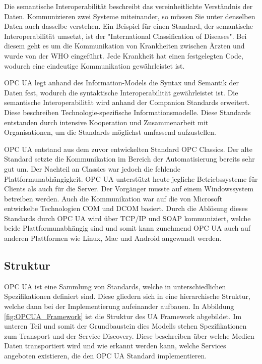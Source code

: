 \documentclass[a4paper, 12pt, oneside]{scrbook}
\begin{document}
	 Die semantische Interoperabilität beschreibt das vereinheitlichte Verständnis der Daten. Kommunizieren zwei Systeme miteinander, so müssen Sie unter denselben Daten auch dasselbe verstehen. Ein Beispiel für einen Standard, der semantische Interoperabilität umsetzt, ist der "International Classification of Diseases". Bei diesem geht es um die Kommunikation von Krankheiten zwischen Ärzten und wurde von der WHO eingeführt. Jede Krankheit hat einen festgelegten Code, wodurch eine eindeutige Kommunikation gewährleistet ist. \cite{mielebacher_verteilte_2021-1}
	 
	 OPC UA legt anhand des Information-Models die Syntax und Semantik der Daten fest, wodurch die syntaktische Interoperabilität gewährleistet ist. Die semantische Interoperabilität wird anhand der Companion Standards erweitert. Diese beschreiben Technologie-spezifische Informationsmodelle. Diese Standards entstanden durch intensive Kooperation und Zusammenarbeit mit Organisationen, um die Standards möglichst umfassend aufzustellen. \cite{mielebacher_verteilte_2021-1}
	 
	 OPC UA entstand aus dem zuvor entwickelten Standard OPC Classics. Der alte Standard setzte die Kommunikation im Bereich der Automatisierung bereits sehr gut um. Der Nachteil an Classics war jedoch die fehlende Plattformunabhängigkeit. OPC UA unterstützt heute jegliche Betriebssysteme für Clients als auch für die Server. Der Vorgänger musste auf einem Windowssystem betreiben werden. Auch die Kommunikation war auf die von Microsoft entwickelte Technologien \ac{COM} und \ac{DCOM} basiert. Durch die Ablösung dieses Standards durch OPC UA wird über TCP/IP und SOAP kommuniziert, welche beide Plattformunabhängig sind und somit kann zunehmend OPC UA auch auf anderen Plattformen wie Linux, Mac und Android angewandt werden. \cite{mielebacher_verteilte_2021-1}
	
		\subsection{Struktur}
		
		OPC UA ist eine Sammlung von Standards, welche in unterschiedlichen Spezifikationen definiert sind. Diese gliedern sich in eine hierarchische Struktur, welche dann bei der Implementierung aufeinander aufbauen. In Abbildung \ref{fig:OPCUA_Framework} ist die Struktur des UA Framework abgebildet. Im unteren Teil und somit der Grundbaustein dies Modells stehen Spezifikationen zum Transport und der Service Discovery. Diese beschreiben über welche Medien Daten transportiert wird und wie erkannt werden kann, welche Services angeboten existieren, die den OPC UA Standard implementieren. \cite{mahnke_opc_2009, rinke_was_2022}
		
\end{document}

